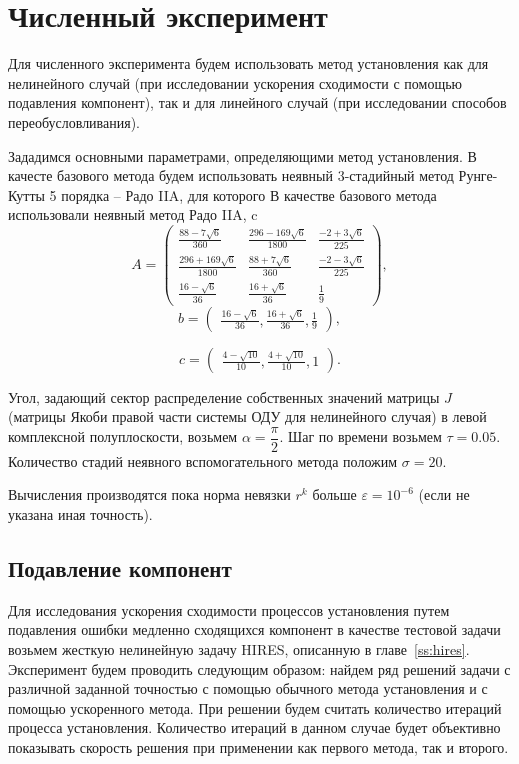 \documentclass[a4paper,14pt]{extreport}
\begin{document}
  
  \chapter{Численный эксперимент}
  \label{c:numer_ex} 
  Для численного эксперимента будем использовать метод установления как для нелинейного случай (при исследовании ускорения сходимости с помощью подавления компонент), так и для линейного случай (при исследовании способов переобусловливания).
  
  Зададимся основными параметрами, определяющими метод установления. В качесте базового метода будем использовать неявный 3-стадийный метод Рунге-Кутты 5 порядка -- Радо IIA, для которого
   В качестве базового метода использовали неявный метод Радо IIA, c
$$A=\left(
\begin{array}{lll}
 \frac{88-7\sqrt{6}}{360} & \frac{296-169\sqrt{6}}{1800} & \frac{-2+3\sqrt{6}}{225} \\
 \frac{296+169\sqrt{6}}{1800} & \frac{88+7\sqrt{6}}{360} & \frac{-2-3\sqrt{6}}{225} \\
 \frac{16-\sqrt{6}}{36} &\frac{16+\sqrt{6}}{36} & \frac{1}{9}
\end{array}
\right),$$
$$b=\left(
\begin{array}{l}
\frac{16-\sqrt{6}}{36},\frac{16+\sqrt{6}}{36},\frac{1}{9}
\end{array}
\right),$$

$$c=\left(
\begin{array}{l}
\frac{4-\sqrt{10}}{10},
\frac{4+\sqrt{10}}{10},
1
\end{array}
\right).$$

Угол, задающий сектор распределение собственных значений матрицы $J$ (матрицы Якоби правой части системы ОДУ для нелинейного случая) в левой комплексной полуплоскости, возьмем $\alpha = \dfrac{\pi}{2}$.
Шаг по времени возьмем $\tau = 0.05$. Количество стадий неявного вспомогательного метода положим $\sigma = 20$.

Вычисления производятся пока норма невязки $r^k$ больше $\varepsilon = 10^{-6}$ (если не указана иная точность).
 
  
  \section{Подавление компонент}
  \label{s:test_opression}
  
  Для исследования ускорения сходимости процессов установления путем подавления ошибки медленно сходящихся компонент в качестве тестовой задачи возьмем жесткую нелинейную задачу HIRES, описанную в главе~\ref{ss:hires}. Эксперимент будем проводить следующим образом: найдем ряд решений задачи с различной заданной точностью с помощью обычного метода установления и с помощью ускоренного метода. При решении будем считать количество итераций процесса установления. Количество итераций в данном случае будет объективно показывать скорость решения при применении как первого метода, так и второго.
  
\end{document}
